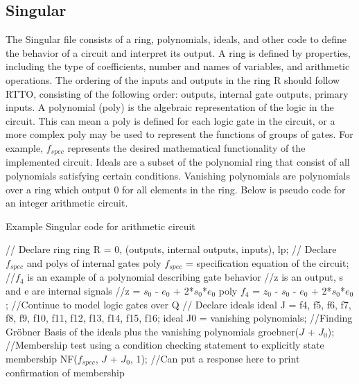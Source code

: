 \documentclass[conference]{IEEEtran}
\begin{document}
\subsection{Singular}
The Singular file consists of a ring, polynomials, ideals, and other code to define the behavior of a circuit and interpret its output. A ring is defined by properties, 
including the type of coefficients, number and names of variables, and arithmetic operations. The ordering of the inputs and outputs in 
the ring R should follow RTTO, consisting of the following order: outputs, internal gate outputs, primary inputs. A polynomial (poly) is the algebraic representation of the logic in the circuit.
This can mean a poly is defined for each logic gate in the circuit, or a more complex poly may be used to represent the functions of groups of gates. 
For example, $f_{spec}$ represents the desired mathematical functionality of the implemented circuit. Ideals are a subset of the polynomial ring 
that consist of all polynomials satisfying certain conditions. Vanishing polynomials are polynomials over a ring which output 0 for all elements in the ring.
 Below is pseudo code for an integer arithmetic circuit.
\begin{algorithm}
    \caption{Example Singular code for arithmetic circuit}
    \begin{algorithmic}
        \STATE // Declare ring
        \STATE ring R = 0, (outputs, internal outputs, inputs), lp;
        \STATE
        \STATE // Declare $f_{spec}$ and polys of internal gates
        \STATE poly $f_{spec}$ = specification equation of the circuit;
        \STATE //$f_{4}$ is an example of a polynomial describing gate behavior
        \STATE //z is an output, s and e are internal signals
        \STATE //z = $s_{0}$ - $e_{0}$ + 2*$s_{0}$*$e_{0}$
        \STATE poly $f_{4}$ = $z_{0}$ - $s_{0}$ - $e_{0}$ + 2*$s_{0}$*$e_{0}$; 
        \STATE //Continue to model logic gates over Q
        \STATE
        \STATE // Declare ideals
        \STATE ideal J = f4, f5,  f6, f7, f8, f9, f10, f11, f12, f13, f14, f15, f16;
        \STATE ideal J0 = vanishing polynomials;
        \STATE
        \STATE //Finding Gröbner Basis of the ideals plus the vanishing polynomials
        \STATE groebner($J$ + $J_{0}$);
        \STATE
        \STATE //Membership test using a condition checking statement to explicitly state membership
        \STATE NF($f_{spec}$, $J$ + $J_{0}$, 1);
        \STATE //Can put a response here to print confirmation of membership
    \end{algorithmic}
\end{algorithm}
\end{document}
